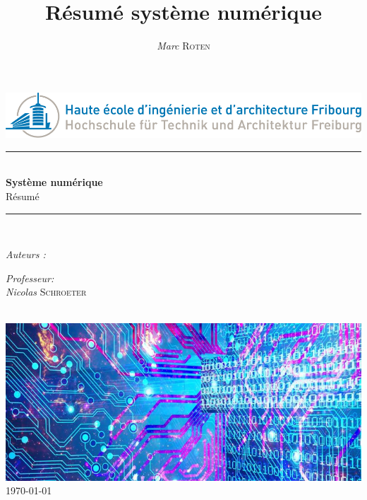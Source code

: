 

\title{Résumé système numérique} 
\author{\textsl{Marc} \textsc{Roten}}
\date{}


    \begin{titlepage}
        \begin{center}
            \includegraphics[scale=.4]{Img/heia-fr-logo.png}\\[1.3cm]
            
            \rule{\linewidth}{0.3mm} \\[0.3cm]
            {\huge \bfseries Système numérique\\[0.5cm]} 
            {\Large  Résumé }
            \rule{\linewidth}{0.3mm} \\[0.8cm]
            \noindent
            \begin{minipage}[t]{0.4\textwidth}
                \begin{flushleft} \large
                    \emph{Auteurs :}\\
                    \theauthor
                \end{flushleft}
            \end{minipage}
            \begin{minipage}[t]{0.4\textwidth} 
                \begin{flushright} \large
                    \emph{Professeur:}\\
                    \textsl{Nicolas} \textsc{ Schroeter}\\ 
                \end{flushright} 
                \vfill
            \end{minipage}\\[1.3cm]
            \includegraphics[scale=0.7]{Img/title.jpg}\\[1.5cm]
            \vspace*{1\baselineskip}
            \today \\[0.7cm]
        \end{center}
    \end{titlepage}
    \tableofcontents
    \clearpage

